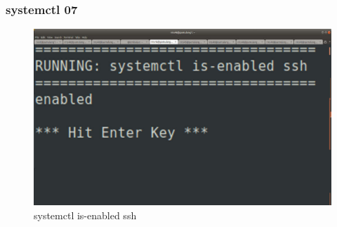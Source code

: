 \documentclass[aspectratio=169, xcolor=table, notheorems, hyperref={pdfpagelabels=false}]{beamer}
\begin{document}
\begin{frame}[fragile]
\frametitle{systemctl 07}
\begin{figure}
\includegraphics[width=.74\linewidth]{os-systemd06.jpg}
\caption{systemctl is-enabled ssh}
\end{figure}
\end{frame}

\end{document}
